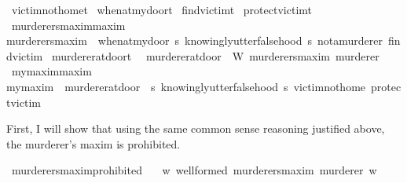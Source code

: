 \begin{isabellebody}
\ victim{\isacharunderscore}not{\isacharunderscore}home{\isacharcolon}{\isacharcolon}t\isanewline
{}\isamarkupfalse%
\ when{\isacharunderscore}at{\isacharunderscore}my{\isacharunderscore}door{\isacharcolon}{\isacharcolon}t\isanewline
{}\isamarkupfalse%
\ find{\isacharunderscore}victim{\isacharcolon}{\isacharcolon}t\isanewline
{}\isamarkupfalse%
\ protect{\isacharunderscore}victim{\isacharcolon}{\isacharcolon}t\isanewline
{}\isamarkupfalse%
\ murderers{\isacharunderscore}maxim{\isacharcolon}{\isacharcolon}maxim\ \ \isanewline
{\isachardoublequoteopen}murderers{\isacharunderscore}maxim\ {\isasymequiv}\ {\isacharparenleft}when{\isacharunderscore}at{\isacharunderscore}my{\isacharunderscore}door{\isacharcomma}\ {\isasymlambda}s{\isachardot}\ knowingly{\isacharunderscore}utter{\isacharunderscore}falsehood\ s\ not{\isacharunderscore}a{\isacharunderscore}murderer{\isacharcomma}\ find{\isacharunderscore}victim{\isacharparenright}{\isachardoublequoteclose}\isanewline
{}\isamarkupfalse%
\ murderer{\isacharunderscore}at{\isacharunderscore}door{\isacharcolon}{\isacharcolon}t\ \ \isanewline
{\isachardoublequoteopen}murderer{\isacharunderscore}at{\isacharunderscore}door\ {\isasymequiv}\ W\ murderers{\isacharunderscore}maxim\ murderer{\isachardoublequoteclose}\isanewline
{}\isamarkupfalse%
\ my{\isacharunderscore}maxim{\isacharcolon}{\isacharcolon}maxim\ \ \isanewline
{\isachardoublequoteopen}my{\isacharunderscore}maxim\ {\isasymequiv}\ {\isacharparenleft}murderer{\isacharunderscore}at{\isacharunderscore}door{\isacharcomma}\ \ {\isasymlambda}s{\isachardot}\ knowingly{\isacharunderscore}utter{\isacharunderscore}falsehood\ s\ victim{\isacharunderscore}not{\isacharunderscore}home{\isacharcomma}\ protect{\isacharunderscore}victim{\isacharparenright}{\isachardoublequoteclose}%
\begin{isamarkuptext}%
First, I will show that using the same common sense reasoning justified above, the murderer's
maxim is prohibited.%
\end{isamarkuptext}\isamarkuptrue%
\isamarkupfalse%
\ murderers{\isacharunderscore}maxim{\isacharunderscore}prohibited{\isacharcolon}\isanewline
\ \ \ {\isachardoublequoteopen}{\isasymforall}w{\isachardot}\ well{\isacharunderscore}formed\ murderers{\isacharunderscore}maxim\ murderer\ w{\isachardoublequoteclose}\isanewline
%
\end{isabellebody}

